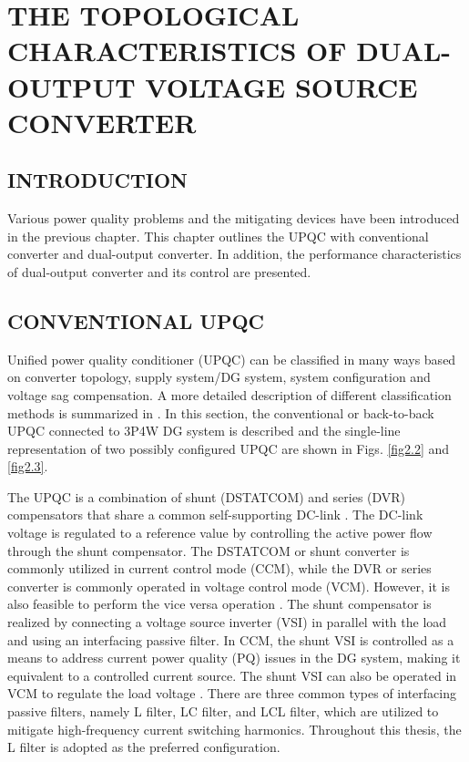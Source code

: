 \chapter{THE TOPOLOGICAL CHARACTERISTICS OF DUAL-OUTPUT VOLTAGE SOURCE CONVERTER}
\label{2.Chap:DOCIntro}
\section{INTRODUCTION} 
Various power quality problems and the mitigating devices have been introduced in the previous chapter. This chapter outlines the UPQC with conventional converter and dual-output converter. In addition, the performance characteristics of dual-output converter and its control are presented. 

\section{{CONVENTIONAL UPQC}} \label{2.Section_UPQC}

Unified power quality conditioner (UPQC) can be classified in many ways based on converter topology, supply system/DG system, system configuration and voltage sag compensation. A more detailed description of different classification methods is summarized in \cite{6095377}. In this section, the conventional or back-to-back UPQC connected to 3P4W DG system is described and the single-line  representation of two possibly configured UPQC are shown in Figs. \ref{fig2.2} and \ref{fig2.3}. 

The UPQC is a combination of shunt (DSTATCOM) and series (DVR) compensators that share a common self-supporting DC-link \cite{662847,akagi1996new}. The DC-link voltage is regulated to a reference value by controlling the active power flow through the shunt compensator. The DSTATCOM or shunt converter is commonly utilized in current control mode (CCM), while the DVR or series converter is commonly operated in voltage control mode (VCM). However, it is also feasible to perform the vice versa operation \cite{1542327}. The shunt compensator is realized by connecting a voltage source inverter (VSI) in parallel with the load and using an interfacing passive filter. In CCM, the shunt VSI is controlled as a means to address current power quality (PQ) issues in the DG system, making it equivalent to a controlled current source. The shunt VSI can also be operated in VCM to regulate the load voltage \cite{1159928,6800136}. There are three common types of interfacing passive filters, namely L filter, LC filter, and LCL filter, which are utilized to mitigate high-frequency current switching harmonics. Throughout this thesis, the L filter is adopted as the preferred configuration.  

